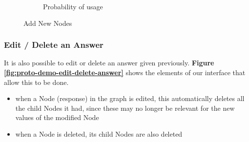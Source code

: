 \begin{figure}[h]
\begin{subfigure}[b]{0.45\textwidth}
            \caption{\label{fig:proto-demo-add-answer-proba} Probability of usage}
        \end{subfigure}
        \caption{\label{fig:add-node}  Add New Nodes}
    \end{figure}
    
    
    \subsubsection{Edit / Delete an Answer}
    It is also possible to edit or delete an answer given previously. \textbf{Figure \ref{fig:proto-demo-edit-delete-answer}} shows the elements of our interface that allow this to be done. 
    
    \begin{itemize}
        \item when a Node (response) in the graph is edited, this automatically deletes all the child Nodes it had, since these may no longer be relevant for the new values of the modified Node
        \item when a Node is deleted, its child Nodes are also deleted\\
    \end{itemize}
    

